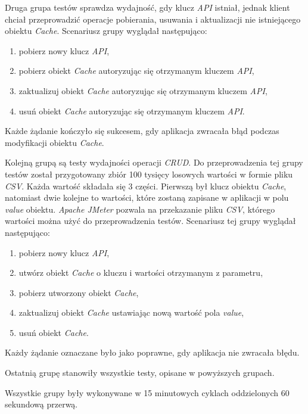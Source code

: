 Druga grupa testów sprawdza wydajność, gdy klucz \textsl{API} istniał, jednak klient chciał przeprowadzić operacje pobierania, usuwania i aktualizacji nie istniejącego obiektu \textsl{Cache}. Scenariusz grupy wyglądał następująco:
\begin{enumerate}
    \item pobierz nowy klucz \textsl{API},
    \item pobierz obiekt \textsl{Cache} autoryzując się otrzymanym kluczem \textsl{API},
    \item zaktualizuj obiekt \textsl{Cache} autoryzując się otrzymanym kluczem \textsl{API},
    \item usuń obiekt \textsl{Cache} autoryzując się otrzymanym kluczem \textsl{API}.
\end{enumerate}
Każde żądanie kończyło się sukcesem, gdy aplikacja zwracała błąd podczas modyfikacji obiektu \textsl{Cache}.

Kolejną grupą są testy wydajności operacji \textsl{CRUD}. Do przeprowadzenia tej grupy testów został przygotowany zbiór 100 tysięcy losowych wartości w formie pliku \textsl{CSV}. Każda wartość składała się 3 części. Pierwszą był klucz obiektu \textsl{Cache}, natomiast dwie kolejne to wartości, które zostaną zapisane w aplikacji w polu \textsl{value} obiektu. \textsl{Apache JMeter} pozwala na przekazanie pliku \textsl{CSV}, którego wartości można użyć do przeprowadzenia testów. 
Scenariusz tej grupy wyglądał następująco:

\begin{enumerate}
    \item pobierz nowy klucz \textsl{API},
    \item utwórz obiekt \textsl{Cache} o kluczu i wartości otrzymanym z parametru,
    \item pobierz utworzony obiekt \textsl{Cache}, 
    \item zaktualizuj obiekt \textsl{Cache} ustawiając nową wartość pola \textsl{value},
    \item usuń obiekt \textsl{Cache}.
\end{enumerate}
Każdy żądanie oznaczane było jako poprawne, gdy aplikacja nie zwracała błędu.

Ostatnią grupę stanowiły wszystkie testy, opisane w powyższych grupach.

Wszystkie grupy były wykonywane w 15 minutowych cyklach oddzielonych 60 sekundową przerwą.

